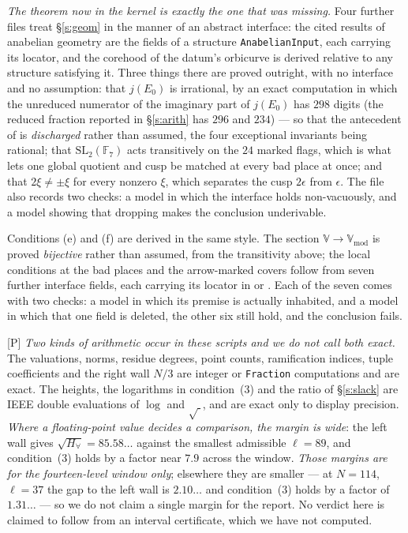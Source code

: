 \documentclass[11pt]{article}
\theoremstyle{plain}
\theoremstyle{definition}
\newcommand{\VV}{\mathbb{V}}
\begin{document}
\emph{The theorem now in the kernel is exactly the one that was missing.}  Four further files treat \S\ref{s:geom} in the manner of an abstract interface: the cited results of anabelian geometry are the fields of a
structure \texttt{AnabelianInput}, each carrying its locator, and the corehood of the
datum's orbicurve is derived relative to any structure satisfying it.  Three things
there are proved outright, with no interface and no assumption: that $j(E_0)$ is
irrational, by an exact computation in which the unreduced numerator of the imaginary
part of $j(E_0)$ has $298$ digits (the reduced fraction reported in \S\ref{s:arith}
has $296$ and $234$) --- so that the
antecedent of \cite[Prop.~2.1]{MFHMP} is \emph{discharged} rather than assumed, the
four exceptional invariants being rational; that $\mathrm{SL}_2(\mathbb F_7)$ acts
transitively on the $24$ marked flags, which is what lets one global quotient and
cusp be matched at every bad place at once; and that $2\xi\ne\pm\xi$ for every
nonzero $\xi$, which separates the cusp $2\epsilon$ from $\epsilon$.  The file also
records two checks: a model in which the interface holds non-vacuously, and a model
showing that dropping \cite[Prop.~2.1]{MFHMP} makes the conclusion underivable.

Conditions (e) and (f) are derived in the same style.  The section
$\VV\to\mathbb V_{\mathrm{mod}}$ is proved \emph{bijective} rather than assumed, from
the transitivity above; the local conditions at the bad places and the arrow-marked
covers follow from seven further interface fields, each carrying its locator in
\cite{IUT1} or \cite{EtTh}.  Each of the seven comes with two checks: a model in
which its premise is actually inhabited, and a model in which that one field is
deleted, the other six still hold, and the conclusion fails.

\textup{[P]} \emph{Two kinds of arithmetic occur in these scripts and we do not call
both exact.}  The valuations, norms, residue degrees, point counts, ramification
indices, tuple coefficients and the right wall $N/3$ are integer or
\texttt{Fraction} computations and are exact.  The heights, the logarithms in
condition~(3) and the ratio of \S\ref{s:slack} are IEEE double evaluations of
$\log$ and $\sqrt{\ }$, and are exact only to display precision.  \emph{Where a
floating-point value decides a comparison, the margin is wide}: the left wall gives
$\sqrt{H_\forall}=85.58\ldots$ against the smallest admissible $\ell=89$, and
condition~(3) holds by a factor near $7.9$ across the window.  \emph{Those margins are
for the fourteen-level window only}; elsewhere they are smaller --- at $N=114$,
$\ell=37$ the gap to the left wall is $2.10\ldots$ and condition~(3) holds by a factor
of $1.31\ldots$ --- so we do not claim a single margin for the report.  No verdict here
is claimed to follow from an interval certificate, which we have not computed.
\end{document}
